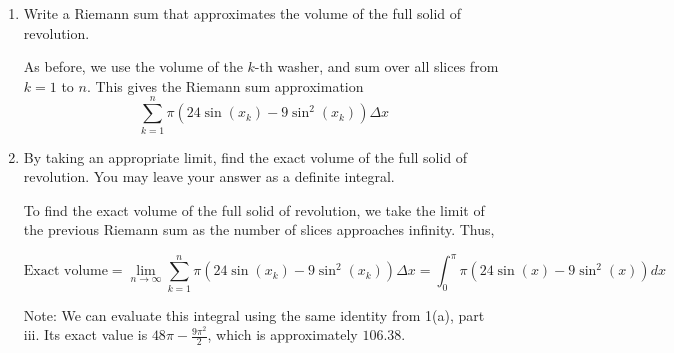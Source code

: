 \documentclass[main]{subfiles}
\begin{document}
\begin{enumerate}
\begin{enumerate}
\begin{enumerate}
\begin{solution}
To find the volume of this washer $V_k$, we take the volume of the entire outer disk (defined by $R_k$) minus the volume of the hole in the middle (defined by $r_k$). So the volume of the $k$-th washer is given by:

\begin{align*}
V_k &= (\text{volume of entire outer disk})-(\text{volume of hole in the middle})\\
 &= (\pi(R_k)^2\Delta x) - (\pi(r_k)^2\Delta x)\\
  &= (\pi(4)^2\Delta x) - (\pi(4-3\sin(x_k))^2\Delta x)\\
  &=\pi\left(16-(4-3\sin(x_k))^2\right)\Delta x\\
  &=\boxed{\pi\left(24\sin(x_k)-9\sin^2(x_k)\right) \Delta x}
\end{align*}


\end{solution}


\item
\begin{problem}[1.2in]
Write a Riemann sum that approximates the volume of the full solid of revolution.
\end{problem}

\begin{solution}
As before, we use the volume of the $k$-th washer, and sum over all slices from $k=1$ to $n$. This gives the Riemann sum approximation $$\boxed{\sum_{k=1}^n \pi\left(24\sin(x_k)-9\sin^2(x_k)\right) \Delta x}$$
\end{solution}

\item
\begin{problem}[1.2in]
By taking an appropriate limit, find the exact volume of the full solid of revolution. You may leave your answer as a definite integral.
\end{problem}

\begin{solution}
To find the exact volume of the full solid of revolution, we take the limit of the previous Riemann sum as the number of slices approaches infinity. Thus,

$$\text{Exact volume} = \lim_{n \to \infty} \sum_{k=1}^n \pi\left(24\sin(x_k)-9\sin^2(x_k)\right) \Delta x = \boxed{\int_0^{\pi} \pi\left(24\sin(x)-9\sin^2(x)\right) dx}$$

Note: We can evaluate this integral using the same identity from 1(a), part iii. Its exact value is $48\pi - \frac{9\pi^2}{2}$, which is approximately $106.38$. 
\end{solution}



\end{enumerate}
\end{enumerate}
\end{enumerate}
\end{document}
